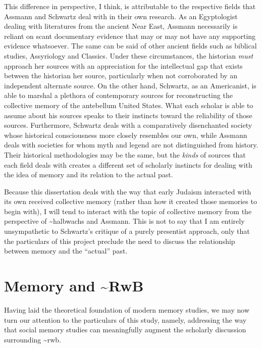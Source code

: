 This difference in perspective, I think, is attributable to the
respective fields that Assmann and Schwartz deal with in their own
research. As an Egyptologist dealing with literatures from the ancient
Near East, Assmann necessarily is reliant on scant documentary evidence
that may or may not have any supporting evidence whatsoever. The same
can be said of other ancient fields such as biblical studies,
Assyriology and Classics. Under these circumstances, the historian
\emph{must} approach her sources with an appreciation for the
intellectual gap that exists between the historian her source,
particularly when not corroborated by an independent alternate source.
On the other hand, Schwartz, as an Americanist, is able to marshal a
plethora of contemporary sources for reconstructing the collective
memory of the antebellum United States. What each scholar is able to
assume about his sources speaks to their instincts toward the
reliability of those sources. Furthermore, Schwartz deals with a
comparatively disenchanted society whose historical consciousness more
closely resembles our own, while Assmann deals with societies for whom
myth and legend are not distinguished from history. Their historical
methodologies may be the same, but the \emph{kinds} of sources that each
field deals with creates a different set of scholarly instincts for
dealing with the idea of memory and its relation to the actual past.

Because this dissertation deals with the way that early Judaism
interacted with its own received collective memory (rather than how it
created those memories to begin with), I will tend to interact with the
topic of collective memory from the perspective of
\textasciitilde{}halbwachs and Assmann. This is not to say that I am
entirely unsympathetic to Schwartz's critique of a purely presentist
approach, only that the particulars of this project preclude the need to
discuss the relationship between memory and the ``actual'' past.

\hypertarget{memory-and-rwb}{%
\section{Memory and \textasciitilde{}RwB}\label{memory-and-rwb}}

Having laid the theoretical foundation of modern memory studies, we may
now turn our attention to the particulars of this study, namely,
addressing the way that social memory studies can meaningfully augment
the scholarly discussion surrounding \textasciitilde{}rwb.\autocite[See
also][]{brooke_zsengeller2014}

